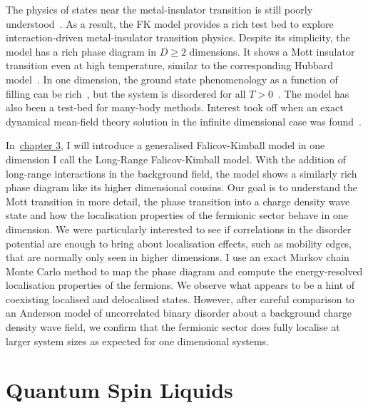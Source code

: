 The physics of states near the metal-insulator transition is still poorly understood~\autocite{belitzAndersonMottTransition1994,baskoMetalInsulatorTransition2006}. As a result, the FK model provides a rich test bed to explore interaction-driven metal-insulator transition physics. Despite its simplicity, the model has a rich phase diagram in \(D \geq 2\) dimensions. It shows a Mott insulator transition even at high temperature, similar to the corresponding Hubbard model~\autocite{brandtThermodynamicsCorrelationFunctions1989}. In one dimension, the ground state phenomenology as a function of filling can be rich~\autocite{gruberGroundStatesSpinless1990}, but the system is disordered for all \(T > 0\)~\autocite{kennedyItinerantElectronModel1986}. The model has also been a test-bed for many-body methods. Interest took off when an exact dynamical mean-field theory solution in the infinite dimensional case was found~\autocite{antipovCriticalExponentsStrongly2014,ribicNonlocalCorrelationsSpectral2016,freericksExactDynamicalMeanfield2003,herrmannNonequilibriumDynamicalCluster2016}.

In~\protect\hyperlink{chap:3-the-long-range-falicov-kimball-model}{chapter 3}, I will introduce a generalised Falicov-Kimball model in one dimension I call the Long-Range Falicov-Kimball model. With the addition of long-range interactions in the background field, the model shows a similarly rich phase diagram like its higher dimensional cousins. Our goal is to understand the Mott transition in more detail, the phase transition into a charge density wave state and how the localisation properties of the fermionic sector behave in one dimension. We were particularly interested to see if correlations in the disorder potential are enough to bring about localisation effects, such as mobility edges, that are normally only seen in higher dimensions. I use an exact Markov chain Monte Carlo method to map the phase diagram and compute the energy-resolved localisation properties of the fermions. We observe what appears to be a hint of coexisting localised and delocalised states. However, after careful comparison to an Anderson model of uncorrelated binary disorder about a background charge density wave field, we confirm that the fermionic sector does fully localise at larger system sizes as expected for one dimensional systems.

\hypertarget{quantum-spin-liquids}{%
\section{Quantum Spin Liquids}\label{quantum-spin-liquids}}


